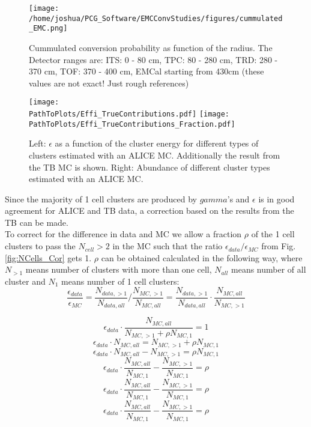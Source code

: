 \documentclass[ALICE]{ALICE_analysis_notes}
\newcommand{\PathToPlots}{/home/joshua/PCG_Software/EMCal_NCellEffi/13TeVNomB_Wide/Pi0Tagging_13TeV_nom_04_26_WithTRD_WithBorderCells_1cellFT/pdf}
\begin{document}
\begin{figure}[t]
	\centering
	\texttt{[image: /home/joshua/PCG\_Software/EMCConvStudies/figures/cummulated\_EMC.png]}
	\caption{Cummulated conversion probability as function of the radius. The Detector ranges are: ITS: 0 - 80 cm, TPC: 80 - 280 cm, TRD: 280 - 370 cm, TOF: 370 - 400 cm, EMCal starting from 430cm (these values are not exact! Just rough references) }
	\label{fig:NCells_Conversions}
\end{figure}


\begin{figure}[t]
	\centering
	\texttt{[image: \\PathToPlots/Effi\_TrueContributions.pdf]}
	\texttt{[image: \\PathToPlots/Effi\_TrueContributions\_Fraction.pdf]}
	\caption{Left: $\epsilon$ as a function of the cluster energy for different types of clusters estimated with an ALICE MC. Additionally the result from the TB MC is shown. Right: Abundance of different cluster types estimated with an ALICE MC.}
	\label{fig:NCells_Conversions2}
\end{figure}

Since the majority of 1 cell clusters are produced by $gamma$'s and $\epsilon$ is in good agreement for ALICE and TB data, a correction based on the results from the TB can be made.\\
To correct for the difference in data and MC we allow a fraction $\rho$ of the 1 cell clusters to pass the $N_{cell} > 2$ in the MC such that the ratio  $\epsilon_{data}/\epsilon_{MC}$ from Fig. \ref{fig:NCells_Cor} gets 1. $\rho$ can be obtained calculated in the following way, where $N_{>1}$ means number of clusters with more than one cell,  $N_{all}$ means number of all cluster and $N_{1}$ means number of 1 cell clusters:
\begin{equation}
\frac{\epsilon_{data}}{\epsilon_{MC}} = \frac{N_{data, >1}}{N_{data, all}} / \frac{N_{MC, >1}}{N_{MC, all}}  = \frac{N_{data, >1}}{N_{data, all}} \cdot \frac{N_{MC, all}}{N_{MC, >1}}
\end{equation} 

\begin{equation}
\epsilon_{data} \cdot \frac{N_{MC, all}}{N_{MC, >1} + \rho N_{MC, 1}} = 1
\end{equation} 
\begin{equation}
\epsilon_{data} \cdot N_{MC, all} = N_{MC, >1} + \rho N_{MC, 1}
\end{equation} 
\begin{equation}
\epsilon_{data} \cdot N_{MC, all} - N_{MC, >1} =  \rho N_{MC, 1}
\end{equation} 
\begin{equation}
\epsilon_{data} \cdot \frac{N_{MC, all}}{N_{MC, 1}} - \frac{N_{MC, >1}}{N_{MC, 1}} =  \rho 
\end{equation} 
\begin{equation}
\epsilon_{data} \cdot \frac{N_{MC, all}}{N_{MC, 1}} - \frac{N_{MC, >1}}{N_{MC, 1}} =  \rho 
\end{equation}
\begin{equation}
\epsilon_{data} \cdot \frac{N_{MC, all}}{N_{MC, 1}} - \frac{N_{MC, >1}}{N_{MC, 1}} =  \rho
\end{equation}
\end{document}
